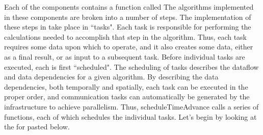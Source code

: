 Each of the \Vaango components contains a function called 
 The algorithms implemented in these
components are broken into a number of steps.  The implementation of
these steps in \Vaango take place in ``tasks".  Each task is
responsible for performing the calculations needed to accomplish that
step in the algorithm.  Thus, each task requires some data upon which
to operate, and it also creates some data, either as a final result,
or as input to a subsequent task.  Before individual tasks are
executed, each is first ``scheduled".  The scheduling of tasks
describes the dataflow and data dependencies for a given algorithm.
By describing the data dependencies, both temporally and spatially,
each task can be executed in the proper order, and communication tasks
can automatically be generated by the \Vaango infrastructure to achieve
parallelism.  Thus, scheduleTimeAdvance calls a series of functions,
each of which schedules the individual tasks.  Let's begin by looking
at the  for 
pasted below.

